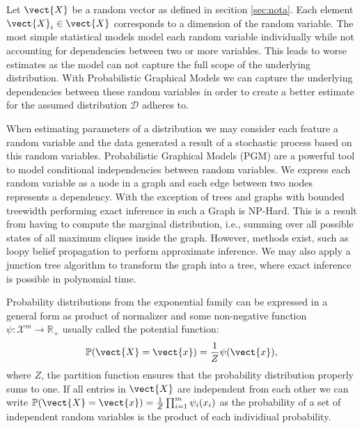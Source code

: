 Let $\vect{X}$ be a random vector as defined in secition \ref{sec:nota}. 
Each element $\vect{X}_i \in \vect{X}$ corresponds to a dimension of the random variable.
The most simple statistical models model each random variable individually while not accounting for dependencies between two or more variables.
This leads to worse estimates as the model can not capture the full scope of the underlying distribution.
With Probabilistic Graphical Models we can capture the underlying dependencies between these random variables in order to create a better estimate for the assumed distribution $\mathcal{D}$ adheres to.

When estimating parameters of a distribution we may consider each feature a random variable and the data generated a result of a stochastic process based on this random variables.
Probabilistic Graphical Models (PGM) are a powerful tool to model conditional independencies between random variables. 
We express each random variable as a node in a graph and each edge between two nodes represents a dependency. 
With the exception of trees and graphs with bounded treewidth performing exact inference in such a Graph is NP-Hard.
This is a result from having to compute the marginal distribution, i.e., summing over all possible states of all maximum cliques inside the graph.
However, methods exist, such as loopy belief propagation to perform approximate inference.
We may also apply a junction tree algorithm to transform the graph into a tree, where exact inference is possible in polynomial time.

Probability distributions from the exponential family can be expressed in a general form as product of normalizer and some non-negative function $\psi: \mathcal{X}^m \rightarrow \mathbb{R}_+$ usually called the potential function:
\begin{equation}
    \label{eq:probpot}
    \mathbb{P}(\vect{X} = \vect{x}) = \frac{1}{Z} \psi(\vect{x}),
\end{equation}
where $Z$, the partition function ensures that the probability distribution properly sums to one.
If all entries in $\vect{X}$ are independent from each other we can write $\mathbb{P}(\vect{X} = \vect{x}) = \frac{1}{Z} \prod_{i=1}^m \psi_i(x_i)$ as the probability of a set of independent random variables is the product of each individiual probability.

